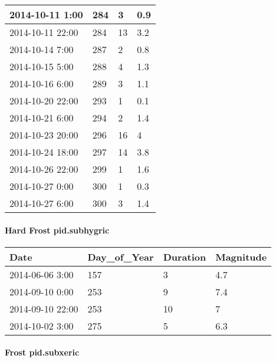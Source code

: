 \documentclass[
]{article}
\begin{document}
\begin{tabular}{l|l|l|l}
\hline
2014-10-11 1:00 & 284 & 3 & 0.9\\
\hline
2014-10-11 22:00 & 284 & 13 & 3.2\\
\hline
2014-10-14 7:00 & 287 & 2 & 0.8\\
\hline
2014-10-15 5:00 & 288 & 4 & 1.3\\
\hline
2014-10-16 6:00 & 289 & 3 & 1.1\\
\hline
2014-10-20 22:00 & 293 & 1 & 0.1\\
\hline
2014-10-21 6:00 & 294 & 2 & 1.4\\
\hline
2014-10-23 20:00 & 296 & 16 & 4\\
\hline
2014-10-24 18:00 & 297 & 14 & 3.8\\
\hline
2014-10-26 22:00 & 299 & 1 & 1.6\\
\hline
2014-10-27 0:00 & 300 & 1 & 0.3\\
\hline
2014-10-27 6:00 & 300 & 3 & 1.4\\
\hline
\end{tabular}

\hypertarget{hard-frost-pid.subhygric}{%
\paragraph{Hard Frost pid.subhygric}\label{hard-frost-pid.subhygric}}

\begin{tabular}{l|l|l|l}
\hline
Date & Day\_of\_Year & Duration & Magnitude\\
\hline
2014-06-06 3:00 & 157 & 3 & 4.7\\
\hline
2014-09-10 0:00 & 253 & 9 & 7.4\\
\hline
2014-09-10 22:00 & 253 & 10 & 7\\
\hline
2014-10-02 3:00 & 275 & 5 & 6.3\\
\hline
\end{tabular}

\hypertarget{frost-pid.subxeric}{%
\paragraph{Frost pid.subxeric}\label{frost-pid.subxeric}}
\end{document}
